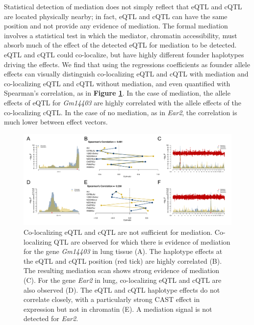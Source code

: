 Statistical detection of mediation does not simply reflect that eQTL and cQTL are located physically nearby; in fact, eQTL and cQTL can have the same position and not provide any evidence of mediation. The formal mediation involves a statistical test in which the mediator, chromatin accessibility, must absorb much of the effect of the detected eQTL for mediation to be detected. eQTL and cQTL could co-localize, but have highly different founder haplotypes driving the effects. We find that using the regressions coefficients as founder allele effects can visually distinguish co-localizing eQTL and cQTL with mediation and co-localizing eQTL and cQTL without mediation, and even quantified with Spearman's correlation, as in \textbf{Figure \ref{fig:colocalization}}. In the case of mediation, the allele effects of eQTL for \textit{Gm14403} are highly correlated with the allele effects of the co-localizing cQTL. In the case of no mediation, as in \textit{Ear2}, the correlation is much lower between effect vectors. 

\begin{figure}
\renewcommand{\familydefault}{\sfdefault}\normalfont
\centering
\includegraphics[width=\textwidth]{figures/6-mediation/mediator_or_colocal.pdf}
\caption[Co-localizing eQTL and cQTL not sufficient for mediation]{Co-localizing eQTL and cQTL are not sufficient for mediation. Co-localizing QTL are observed for which there is evidence of mediation for the gene \textit{Gm14403} in lung tissue (A). The haplotype effects at the eQTL and cQTL position (red tick) are highly correlated (B). The resulting mediation scan shows strong evidence of mediation (C). For the gene \textit{Ear2} in lung, co-localizing eQTL and cQTL are also observed (D). The eQTL and cQTL haplotype effects do not correlate closely, with a particularly strong CAST effect in expression but not in chromatin (E). A mediation signal is not detected for \textit{Ear2}.\label{fig:colocalization}}
\end{figure}

